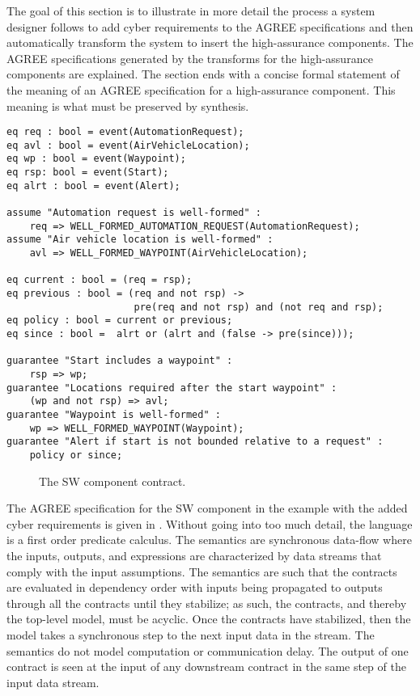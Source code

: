 The goal of this section is to illustrate in more detail the process a system designer follows to add cyber requirements to the AGREE specifications and then automatically transform the system to insert the high-assurance components. The AGREE specifications generated by the transforms for the high-assurance components are explained. The section ends with a concise formal statement of the meaning of an AGREE specification for a high-assurance component. This meaning is what must be preserved by synthesis.

\newsavebox{\sw}
\begin{lrbox}{\sw}
\begin{lstlisting}[style=agree]
eq req : bool = event(AutomationRequest);
eq avl : bool = event(AirVehicleLocation);
eq wp : bool = event(Waypoint);
eq rsp: bool = event(Start);
eq alrt : bool = event(Alert);
            
assume "Automation request is well-formed" :
    req => WELL_FORMED_AUTOMATION_REQUEST(AutomationRequest);
assume "Air vehicle location is well-formed" :
    avl => WELL_FORMED_WAYPOINT(AirVehicleLocation);

eq current : bool = (req = rsp);
eq previous : bool = (req and not rsp) ->
                      pre(req and not rsp) and (not req and rsp);
eq policy : bool = current or previous;
eq since : bool =  alrt or (alrt and (false -> pre(since)));

guarantee "Start includes a waypoint" :
    rsp => wp;
guarantee "Locations required after the start waypoint" :
    (wp and not rsp) => avl;
guarantee "Waypoint is well-formed" :
    wp => WELL_FORMED_WAYPOINT(Waypoint);
guarantee "Alert if start is not bounded relative to a request" :
    policy or since;
\end{lstlisting}
\end{lrbox}

\begin{figure}
  \begin{center}
    \scalebox{0.60}{\usebox{\sw}}
  \end{center}
  \caption{The SW component contract.}
  \label{fig:sw}
\end{figure}

The AGREE specification for the SW component in the example with the added cyber requirements is given in . Without going into too much detail, the language is a first order predicate calculus. The semantics are synchronous data-flow where the inputs, outputs, and expressions are characterized by data streams that comply with the input assumptions. The semantics are such that the contracts are evaluated in dependency order with inputs being propagated to outputs through all the contracts until they stabilize; as such, the contracts, and thereby the top-level model, must be acyclic. Once the contracts have stabilized, then the model takes a synchronous step to the next input data in the stream. The semantics do not model computation or communication delay. The output of one contract is seen at the input of any downstream contract in the same step of the input data stream. 

